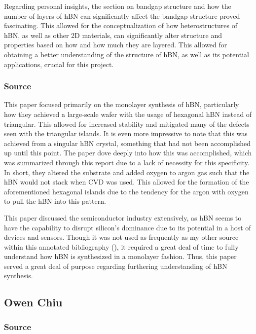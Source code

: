 \documentclass[conference]{IEEEtran}
\begin{document}
Regarding personal insights, the section on bandgap structure and how the number of layers of hBN can significantly affect the bandgap structure proved fascinating. This allowed for the conceptualization of how heterostructures of hBN, as well as other 2D materials, can significantly alter structure and properties based on how and how much they are layered. This allowed for obtaining a better understanding of the structure of hBN, as well as its potential applications, crucial for this project.

\subsubsection{Source \cite{jb2}}

This paper focused primarily on the monolayer synthesis of hBN, particularly how they achieved a large-scale wafer with the usage of hexagonal hBN instead of triangular. This allowed for increased stability and mitigated many of the defects seen with the triangular islands. It is even more impressive to note that this was achieved from a singular hBN crystal, something that had not been accomplished up until this point. The paper dove deeply into how this was accomplished, which was summarized through this report due to a lack of necessity for this specificity. In short, they altered the substrate and added oxygen to argon gas such that the hBN would not stack when CVD was used. This allowed for the formation of the aforementioned hexagonal islands due to the tendency for the argon with oxygen to pull the hBN into this pattern.

This paper discussed the semiconductor industry extensively, as hBN seems to have the capability to disrupt silicon’s dominance due to its potential in a host of devices and sensors. Though it was not used as frequently as my other source within this annotated bibliography (\cite{jb1}), it required a great deal of time to fully understand how hBN is synthesized in a monolayer fashion. Thus, this paper served a great deal of purpose regarding furthering understanding of hBN synthesis.

\subsection{Owen Chiu}

\subsubsection{Source \cite{oc1}}
\end{document}
